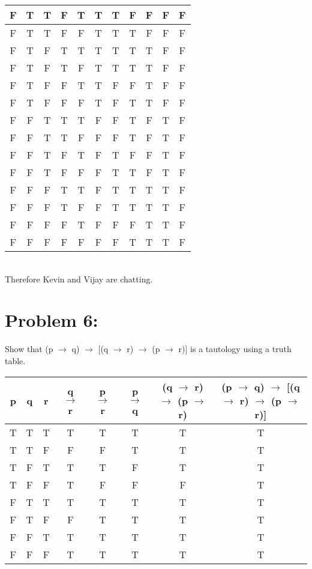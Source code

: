 \documentclass[12pt,en,a4paper]{article}
\begin{document}
\begin{tabular}{|c|c|c|c|c|c|c|c|c|c|c|}
		\hline
		F & T & T & F & T & T & T & F & F & F & F\\
		\hline
		F & T & T & F & F & T & T & T & F & F & F\\
		\hline
		F & T & F & T & T & T & T & T & T & F & F\\
		\hline
		F & T & F & T & F & T & T & T & T & F & F\\
		\hline
		F & T & F & F & T & T & F & F & T & F & F\\
		\hline
		F & T & F & F & F & T & F & T & T & F & F\\
		\hline
		F & F & T & T & T & F & F & T & F & T & F\\
		\hline
		F & F & T & T & F & F & F & T & F & T & F\\
		\hline
		F & F & T & F & T & F & T & F & F & T & F\\
		\hline
		F & F & T & F & F & F & T & T & F & T & F\\
		\hline
		F & F & F & T & T & F & T & T & T & T & F\\
		\hline
		F & F & F & T & F & F & T & T & T & T & F\\
		\hline
		F & F & F & F & T & F & F & F & T & T & F\\
		\hline
		F & F & F & F & F & F & F & T & T & T & F\\
		\hline
	\end{tabular}\\
	Therefore Kevin and Vijay are chatting.
\newpage
{}
	\section*{Problem 6:}
	Show that (p $\rightarrow$ q) $\rightarrow$ [(q $\rightarrow$ r) $\rightarrow$ (p $\rightarrow$ r)] is a tautology using a truth table.\\
	\begin{tabular}{|c|c|c|c|c|c|c|c|}
		\hline
		p & q & r & q $\rightarrow$ r & p $\rightarrow$ r & p $\rightarrow$ q & (q $\rightarrow$ r) $\rightarrow$ (p $\rightarrow$ r) & (p $\rightarrow$ q) $\rightarrow$ [(q $\rightarrow$ r) $\rightarrow$ (p $\rightarrow$ r)]\\
		\hline
		T & T & T & T & T & T & T & T\\
		\hline
		T & T & F & F & F & T & T & T\\
		\hline
		T & F & T & T & T & F & T & T\\
		\hline
		T & F & F & T & F & F & F & T\\
		\hline
		F & T & T & T & T & T & T & T\\
		\hline
		F & T & F & F & T & T & T & T\\
		\hline
		F & F & T & T & T & T & T & T\\
		\hline
		F & F & F & T & T & T & T & T\\
		\hline
	\end{tabular}
\newpage
{}
\end{document}
